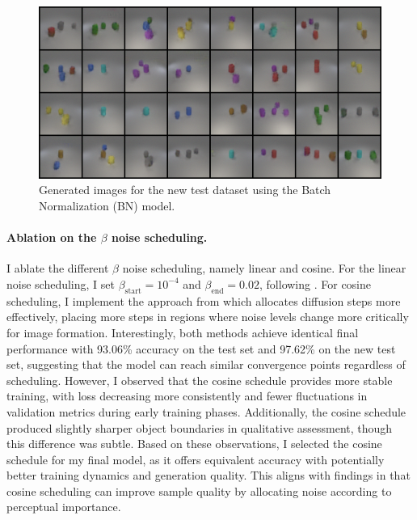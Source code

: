 \documentclass[a4paper,twocolumn]{article}
\begin{document}
\begin{figure}[H]
\centering
\includegraphics[width=0.95\linewidth]{figures/new_test_grid_bn}
\caption{Generated images for the new test dataset using the Batch Normalization (BN) model.}
\label{fig:newtestgridbn}
\end{figure}

\paragraph{Ablation on the $\beta$ noise scheduling.}

I ablate the different $\beta$ noise scheduling, namely linear\cite{ho2020denoising} and cosine\cite{nichol2021improved}. For the linear noise scheduling, I set $\beta_{\text{start}} = 10^{-4}$ and $\beta_{\text{end}} = 0.02$, following \cite{ho2020denoising}. For cosine scheduling, I implement the approach from \cite{nichol2021improved} which allocates diffusion steps more effectively, placing more steps in regions where noise levels change more critically for image formation. Interestingly, both methods achieve identical final performance with 93.06\% accuracy on the test set and 97.62\% on the new test set, suggesting that the model can reach similar convergence points regardless of scheduling. However, I observed that the cosine schedule provides more stable training, with loss decreasing more consistently and fewer fluctuations in validation metrics during early training phases. Additionally, the cosine schedule produced slightly sharper object boundaries in qualitative assessment, though this difference was subtle. Based on these observations, I selected the cosine schedule for my final model, as it offers equivalent accuracy with potentially better training dynamics and generation quality. This aligns with findings in \cite{nichol2021improved} that cosine scheduling can improve sample quality by allocating noise according to perceptual importance.
\end{document}
